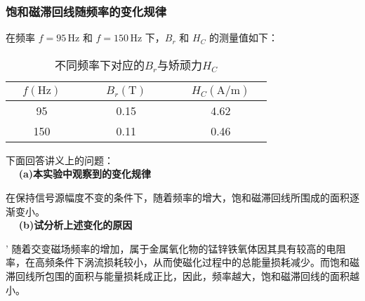 \documentclass[UTF-8,twoside,cs4size]{ctexart}
\begin{document}
\subsubsection{饱和磁滞回线随频率的变化规律}
在频率 $f=95\,\mathrm{Hz}$ 和 $f=150\,\mathrm{Hz}$ 下，$B_r$ 和 $H_C$ 的测量值如下：
\begin{table}[h]
    \centering
    \begin{tabular}{|c|c|c|}
        \hline
        $ \quad f(\mathrm{Hz})\quad $ & $ \qquad B_r(\mathrm T)\qquad $ & $ \quad H_C(\mathrm{A/m})\quad $\\
        \hline
        95 & 0.15 & 4.62\\
        \hline
        150 & 0.11 & 0.46\\
        \hline
    \end{tabular}
    \caption{\small 不同频率下对应的$ B_r $与矫顽力$ H_C $}
    \label{tab2}
\end{table}
下面回答讲义上的问题：  \\
$\quad$ \textbf{(a)本实验中观察到的变化规律}\par
在保持信号源幅度不变的条件下，随着频率的增大，饱和磁滞回线所围成的面积逐渐变小。\\
$\quad$ \textbf{(b)试分析上述变化的原因}\par'
随着交变磁场频率的增加，属于金属氧化物的锰锌铁氧体因其具有较高的电阻率，在高频条件下涡流损耗较小，从而使磁化过程中的总能量损耗减少。而饱和磁滞回线所包围的面积与能量损耗成正比，因此，频率越大，饱和磁滞回线的面积越小。
\end{document}
